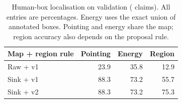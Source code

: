 \begin{table}[t]
\caption{Human-box localisation on validation (\LookGtClaims{} claims). All entries are percentages.
Energy uses the exact union of annotated boxes. Pointing and energy share the map; region accuracy
also depends on the proposal rule.}
\label{tab:look-human}
\centering\footnotesize
\begin{tabular}{@{}lrrr@{}}
\toprule
Map + region rule & Pointing & Energy & Region \\
\midrule
Raw + v1 & 23.9 & 35.8 & 12.9 \\
Sink + v1 & 88.3 & 73.2 & 55.7 \\
Sink + v2 & 88.3 & 73.2 & 75.3 \\
\bottomrule
\end{tabular}
\end{table}
